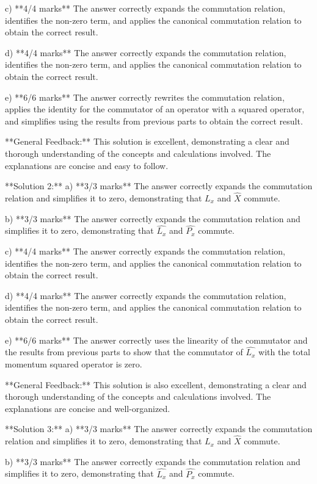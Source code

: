 \documentclass[a4paper,11pt]{article}
\begin{document}
c) **4/4 marks**
The answer correctly expands the commutation relation, identifies the non-zero term, and applies the canonical commutation relation to obtain the correct result.

d) **4/4 marks**
The answer correctly expands the commutation relation, identifies the non-zero term, and applies the canonical commutation relation to obtain the correct result.

e) **6/6 marks**
The answer correctly rewrites the commutation relation, applies the identity for the commutator of an operator with a squared operator, and simplifies using the results from previous parts to obtain the correct result.

**General Feedback:** This solution is excellent, demonstrating a clear and thorough understanding of the concepts and calculations involved. The explanations are concise and easy to follow.

**Solution 2:**
a) **3/3 marks**
The answer correctly expands the commutation relation and simplifies it to zero, demonstrating that \(\hat{L_x}\) and \(\hat{X}\) commute.

b) **3/3 marks**
The answer correctly expands the commutation relation and simplifies it to zero, demonstrating that \(\hat{L_x}\) and \(\hat{P_x}\) commute.

c) **4/4 marks**
The answer correctly expands the commutation relation, identifies the non-zero term, and applies the canonical commutation relation to obtain the correct result.

d) **4/4 marks**
The answer correctly expands the commutation relation, identifies the non-zero term, and applies the canonical commutation relation to obtain the correct result.

e) **6/6 marks**
The answer correctly uses the linearity of the commutator and the results from previous parts to show that the commutator of \(\hat{L_x}\) with the total momentum squared operator is zero.

**General Feedback:** This solution is also excellent, demonstrating a clear and thorough understanding of the concepts and calculations involved. The explanations are concise and well-organized.

**Solution 3:**
a) **3/3 marks**
The answer correctly expands the commutation relation and simplifies it to zero, demonstrating that \(\hat{L_x}\) and \(\hat{X}\) commute.

b) **3/3 marks**
The answer correctly expands the commutation relation and simplifies it to zero, demonstrating that \(\hat{L_x}\) and \(\hat{P_x}\) commute.
\end{document}
